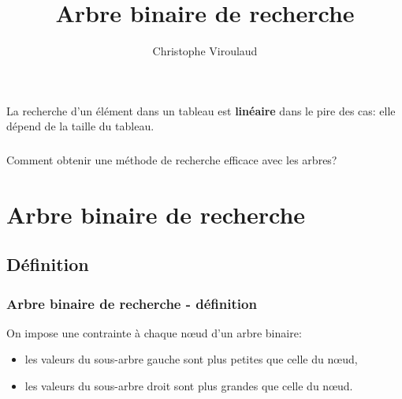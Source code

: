 \documentclass[svgnames,11pt]{beamer}
\author[]{Christophe Viroulaud}
\title{Arbre binaire de recherche}
\date{\framebox{\textbf{Algo 09}}}
\institute{Terminale - NSI}
\begin{document}
\begin{frame}
    \titlepage
\end{frame}
\begin{frame}
    \frametitle{}
    La recherche d'un élément dans un tableau est \textbf{linéaire} dans le pire des cas: elle dépend de la taille du tableau.

    \begin{center}
    \end{center}
\end{frame}
\begin{frame}
    \frametitle{}

    \begin{framed}
        \centering Comment obtenir une méthode de recherche efficace avec les arbres?
    \end{framed}

\end{frame}
\section{Arbre binaire de recherche}
\subsection{Définition}
\begin{frame}
    \frametitle{Arbre binaire de recherche - définition}

    On impose une contrainte à chaque nœud d'un arbre binaire:
    \begin{itemize}
        \item les valeurs du sous-arbre gauche sont plus petites que celle du nœud,
        \item les valeurs du sous-arbre droit sont plus grandes que celle du nœud.
    \end{itemize}
\end{frame}
\end{document}
